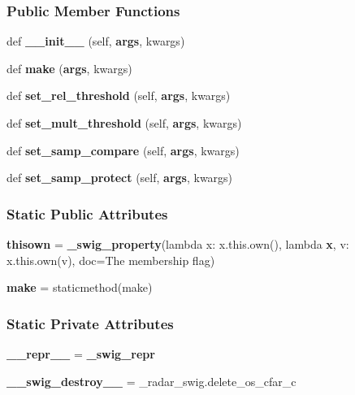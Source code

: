 \subsubsection*{Public Member Functions}
\begin{DoxyCompactItemize}
\item 
def {\bf \+\_\+\+\_\+init\+\_\+\+\_\+} (self, {\bf args}, kwargs)
\item 
def {\bf make} ({\bf args}, kwargs)
\item 
def {\bf set\+\_\+rel\+\_\+threshold} (self, {\bf args}, kwargs)
\item 
def {\bf set\+\_\+mult\+\_\+threshold} (self, {\bf args}, kwargs)
\item 
def {\bf set\+\_\+samp\+\_\+compare} (self, {\bf args}, kwargs)
\item 
def {\bf set\+\_\+samp\+\_\+protect} (self, {\bf args}, kwargs)
\end{DoxyCompactItemize}
\subsubsection*{Static Public Attributes}
\begin{DoxyCompactItemize}
\item 
{\bf thisown} = {\bf \+\_\+swig\+\_\+property}(lambda x\+: x.\+this.\+own(), lambda {\bf x}, v\+: x.\+this.\+own(v), doc=\textquotesingle{}The membership flag\textquotesingle{})
\item 
{\bf make} = staticmethod(make)
\end{DoxyCompactItemize}
\subsubsection*{Static Private Attributes}
\begin{DoxyCompactItemize}
\item 
{\bf \+\_\+\+\_\+repr\+\_\+\+\_\+} = {\bf \+\_\+swig\+\_\+repr}
\item 
{\bf \+\_\+\+\_\+swig\+\_\+destroy\+\_\+\+\_\+} = \+\_\+radar\+\_\+swig.\+delete\+\_\+os\+\_\+cfar\+\_\+c
\end{DoxyCompactItemize}


